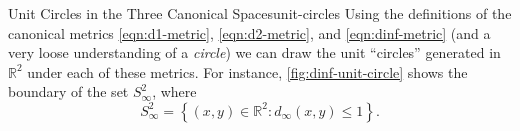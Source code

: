 \documentclass{article}
\numberwithin{equation}{section}
\numberwithin{figure}{section}
\begin{document}
\begin{example}{Unit Circles in the Three Canonical Spaces}{unit-circles}
    Using the definitions of the canonical metrics \cref{eqn:d1-metric},
    \cref{eqn:d2-metric}, and \cref{eqn:dinf-metric} (and a very loose
    understanding of a \emph{circle}) we can draw the unit ``circles'' generated
    in $ \mathbb{R}^2 $ under each of these metrics. For instance,
    \cref{fig:dinf-unit-circle} shows the boundary of the set $ S^2_\infty $,
    where
    \begin{equation}
        S^2_\infty = \left\{ (x, y) \in \mathbb{R}^2 \colon d_\infty(x, y) \leq
        1 \right\}.
    \end{equation}

    \begin{minipage}{.3\linewidth}
        \centering
        \label{fig:d1-unit-circle}
    \end{minipage}\hfill
    \begin{minipage}{.3\linewidth}
        \centering
        \label{fig:d2-unit-circle}
    \end{minipage}\hfill
    \begin{minipage}{.3\linewidth}
        \centering
        \label{fig:dinf-unit-circle}
    \end{minipage}
\end{example}
\end{document}
